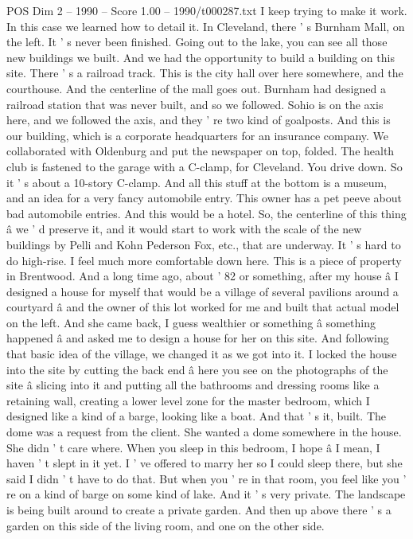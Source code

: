\begin{textsample}{POS Dim 2 – 1990 – Score 1.00 – 1990/t000287.txt}
I keep trying to make it work.
In this case we learned how to detail it.
In Cleveland, there ' s Burnham Mall, on the left.
It ' s never been finished.
Going out to the lake, you can see all those new buildings we built.
And we had the opportunity to build a building on this site.
There ' s a railroad track.
This is the city hall over here somewhere, and the courthouse.
And the centerline of the mall goes out.
Burnham had designed a railroad station that was never built, and so we followed.
Sohio is on the axis here, and we followed the axis, and they ' re two kind of goalposts.
And this is our building, which is a corporate headquarters for an insurance company.
We collaborated with Oldenburg and put the newspaper on top, folded.
The health club is fastened to the garage with a C-clamp, for Cleveland.
You drive down.
So it ' s about a 10-story C-clamp.
And all this stuff at the bottom is a museum, and an idea for a very fancy automobile entry.
This owner has a pet peeve about bad automobile entries.
And this would be a hotel.
So, the centerline of this thing â we ' d preserve it, and it would start to work with the scale of the new buildings by Pelli and Kohn Pederson Fox, etc., that are underway.
It ' s hard to do high-rise.
I feel much more comfortable down here.
This is a piece of property in Brentwood.
And a long time ago, about ' 82 or something, after my house â I designed a house for myself that would be a village of several pavilions around a courtyard â and the owner of this lot worked for me and built that actual model on the left.
And she came back, I guess wealthier or something â something happened â and asked me to design a house for her on this site.
And following that basic idea of the village, we changed it as we got into it.
I locked the house into the site by cutting the back end â here you see on the photographs of the site â slicing into it and putting all the bathrooms and dressing rooms like a retaining wall, creating a lower level zone for the master bedroom, which I designed like a kind of a barge, looking like a boat.
And that ' s it, built.
The dome was a request from the client.
She wanted a dome somewhere in the house.
She didn ' t care where.
When you sleep in this bedroom, I hope â I mean, I haven ' t slept in it yet.
I ' ve offered to marry her so I could sleep there, but she said I didn ' t have to do that.
But when you ' re in that room, you feel like you ' re on a kind of barge on some kind of lake.
And it ' s very private.
The landscape is being built around to create a private garden.
And then up above there ' s a garden on this side of the living room, and one on the other side.

\end{textsample}
